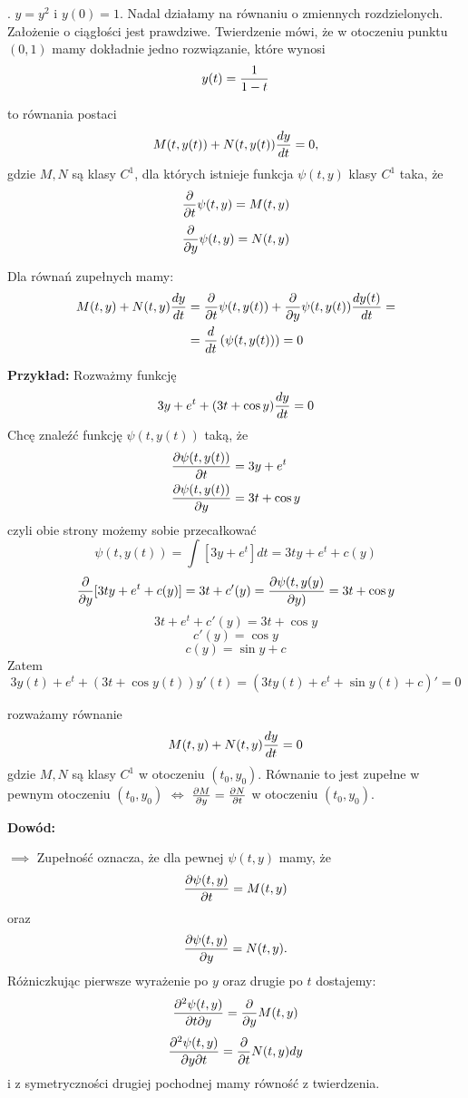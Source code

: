 . $y=y^2$ i $y(0)=1$. Nadal działamy na równaniu o zmiennych rozdzielonych. Założenie o ciągłości jest prawdziwe. Twierdzenie mówi, że w otoczeniu punktu $(0, 1)$ mamy dokładnie jedno rozwiązanie, które wynosi 
$$y(t)={1\over 1-t}$$

\medskip

 to równania postaci
$$M(t, y(t))+N(t, y(t)){dy\over dt}=0,$$
gdzie $M, N$ są klasy $C^1$, dla których istnieje funkcja $\psi(t, y)$ klasy $C^1$ taka, że 
$${\partial\over \partial t}\psi(t, y)=M(t, y)$$
$${\partial\over\partial y}\psi(t, y)=N(t, y)$$

Dla równań zupełnych mamy:
\begin{align*}
    M(t, y)+N(t, y){dy\over dt}&={\partial\over \partial t}\psi(t, y(t))+{\partial\over\partial y}\psi(t, y(t)){dy(t)\over dt}=\\
    &={d\over dt}\left(\psi(t, y(t))\right)=0
\end{align*}

\textbf{Przykład:} Rozważmy funkcję
$$3y+e^t+(3t+\cos y){dy\over dt}=0$$
Chcę znaleźć funkcję $\psi(t, y(t))$ taką, że
\begin{align*}
    {\partial\psi(t, y(t))\over\partial t}&=3y+e^t\\
    {\partial\psi(t, y(t))\over\partial y}&=3t+\cos y
\end{align*}
czyli obie strony możemy sobie przecałkować
$$\psi(t, y(t))=\int [3y+e^t]dt=3ty+e^t+c(y)$$
$${\partial\over\partial y}[3ty+e^t+c(y)]=3t+c'(y)={\partial\psi(t,y(y)\over\partial y)}=3t+\cos y$$
$$3t+e^t+c'(y)=3t+\cos y$$
$$c'(y)=\cos y$$
$$c(y)=\sin y+c$$
Zatem
$$3y(t)+e^t+(3t+\cos y(t))y'(t)=(3ty(t)+e^t+\sin y(t)+c)'=0$$

 rozważamy równanie
$$M(t, y)+N(t, y){dy\over dt}=0$$
gdzie $M, N$ są klasy $C^1$ w otoczeniu $(t_0, y_0)$. Równanie to jest zupełne w pewnym otoczeniu $(t_0, y_0)$ $\iff$ ${\partial M\over\partial y}={\partial N\over\partial t}$ w otoczeniu $(t_0, y_0)$.

\textbf{Dowód:}

$\implies$ Zupełność oznacza, że dla pewnej $\psi(t, y)$ mamy, że 
$${\partial\psi(t, y)\over \partial t}=M(t, y)$$ 
oraz 
$${\partial\psi(t, y)\over\partial y}=N(t, y).$$
Różniczkując pierwsze wyrażenie po $y$ oraz drugie po $t$ dostajemy:
$${\partial^2\psi(t, y)\over\partial t\partial y}={\partial\over\partial y} M(t, y)$$
$${\partial^2\psi(t, y)\over\partial y\partial t}={\partial\over\partial t} N(t, y)dy$$
i z symetryczności drugiej pochodnej mamy równość z twierdzenia.


